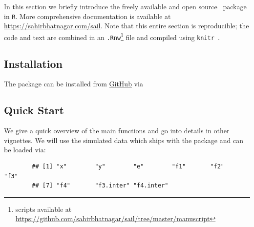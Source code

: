 In this section we briefly introduce the freely available and open source \sail ~package in \texttt{R}. More comprehensive documentation is available at \url{https://sahirbhatnagar.com/sail}. Note that this entire section is reproducible; the code and text are combined in an \texttt{.Rnw}\footnote[1]{scripts available at \url{https://github.com/sahirbhatnagar/sail/tree/master/manuscript}} file and compiled using \texttt{knitr}~\citep{xie2015dynamic}. 

\subsection{Installation}

The package can be installed from \href{https://github.com/sahirbhatnagar/sail}{GitHub} via


\begin{knitrout}\scriptsize
	\color{fgcolor}\begin{kframe}
		\begin{alltt}
			\hlstd{(}\hlstd{)}
			\hlopt{::}\hlstd{(}\hlstd{)}
		\end{alltt}
	\end{kframe}
\end{knitrout}



\subsection{Quick Start}

We give a quick overview of the main functions and go into details in other vignettes. We will use the simulated data which ships with the package and can be loaded via:

\begin{knitrout}\scriptsize
	\color{fgcolor}\begin{kframe}
		\begin{alltt}
			\hlstd{(sail)}
			\hlstd{(}\hlstd{)}
			\hlstd{(sailsim)}
		\end{alltt}
		\begin{verbatim}
		## [1] "x"        "y"        "e"        "f1"       "f2"       "f3"      
		## [7] "f4"       "f3.inter" "f4.inter"
		\end{verbatim}
	\end{kframe}
\end{knitrout}

